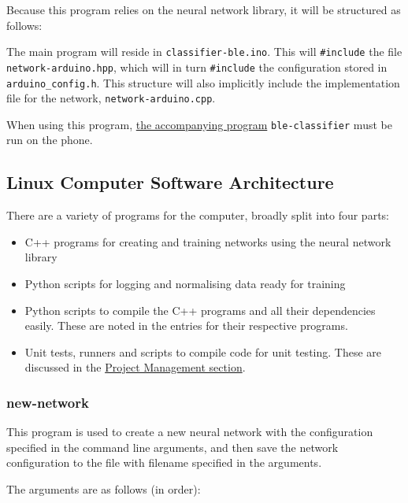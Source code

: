 \documentclass[a4paper]{article}
\begin{document}
Because this program relies on the neural network library, it will be structured as follows:

The main program will reside in \lstinline{classifier-ble.ino}. This will \lstinline{#include} the file \lstinline{network-arduino.hpp}, which will in turn \lstinline{#include} the configuration stored in \lstinline{arduino_config.h}. 
This structure will also implicitly include the implementation file for the network, \lstinline{network-arduino.cpp}.


When using this program, \hyperref[subsubsec:dc_asa_classifier]{the accompanying program} \lstinline{ble-classifier} must be run on the phone.

\subsection{Linux Computer Software Architecture}%
\label{subsec:dc_csa}


There are a variety of programs for the computer, broadly split into four parts:

\begin{itemize}
\item C++ programs for creating and training networks using the neural network library
\item Python scripts for logging and normalising data ready for training
\item Python scripts to compile the C++ programs and all their dependencies easily. These are noted in the entries for their respective programs.
\item Unit tests, runners and scripts to compile code for unit testing. These are discussed in the \hyperref[subsec:pp_testing]{Project Management section}.
\end{itemize}

\subsubsection{new-network}%
\label{subsubsec:dc_csa_newnetwork}

This program is used to create a new neural network with the configuration specified in the command line arguments, and then save the network configuration to the file with filename specified in the arguments.

The arguments are as follows (in order):
\end{document}
